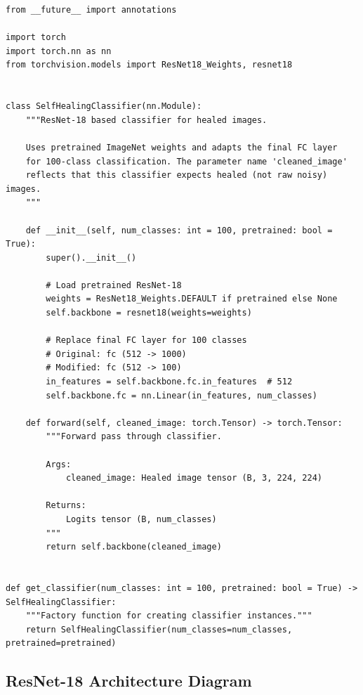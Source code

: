 \documentclass[11pt,a4paper]{article}
\begin{document}
\begin{lstlisting}[caption={src/classifier.py - Complete File}, label={lst:classifier}]
from __future__ import annotations

import torch
import torch.nn as nn
from torchvision.models import ResNet18_Weights, resnet18


class SelfHealingClassifier(nn.Module):
    """ResNet-18 based classifier for healed images.

    Uses pretrained ImageNet weights and adapts the final FC layer
    for 100-class classification. The parameter name 'cleaned_image'
    reflects that this classifier expects healed (not raw noisy) images.
    """

    def __init__(self, num_classes: int = 100, pretrained: bool = True):
        super().__init__()

        # Load pretrained ResNet-18
        weights = ResNet18_Weights.DEFAULT if pretrained else None
        self.backbone = resnet18(weights=weights)

        # Replace final FC layer for 100 classes
        # Original: fc (512 -> 1000)
        # Modified: fc (512 -> 100)
        in_features = self.backbone.fc.in_features  # 512
        self.backbone.fc = nn.Linear(in_features, num_classes)

    def forward(self, cleaned_image: torch.Tensor) -> torch.Tensor:
        """Forward pass through classifier.

        Args:
            cleaned_image: Healed image tensor (B, 3, 224, 224)

        Returns:
            Logits tensor (B, num_classes)
        """
        return self.backbone(cleaned_image)


def get_classifier(num_classes: int = 100, pretrained: bool = True) -> SelfHealingClassifier:
    """Factory function for creating classifier instances."""
    return SelfHealingClassifier(num_classes=num_classes, pretrained=pretrained)
\end{lstlisting}

\subsection{ResNet-18 Architecture Diagram}
\end{document}

